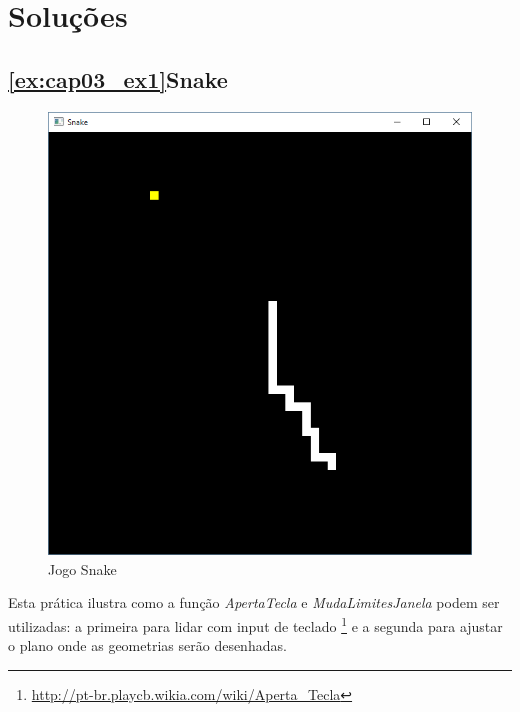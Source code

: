 \section{Soluções}

\subsection{\ref{ex:cap03_ex1}Snake}
\begin{figure}[ht]
  \centerline{\includegraphics[width=.5\textwidth]{img/cap3_ex10.png}}
  \caption{Jogo Snake}
  \label{fig:cap03_ex1}
\end{figure}
Esta prática ilustra como a função \emph{ApertaTecla} e \emph{MudaLimitesJanela} podem ser utilizadas: a primeira para lidar com input de teclado \footnote{\url{http://pt-br.playcb.wikia.com/wiki/Aperta_Tecla}} e a segunda para ajustar o plano onde as geometrias serão desenhadas.

